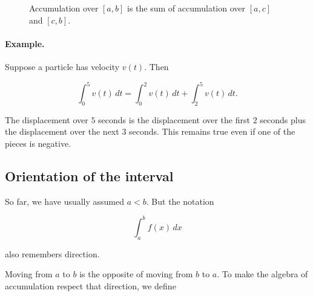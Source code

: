 \begin{figure}[h]
\centering
{}
\caption{Accumulation over \([a,b]\) is the sum of accumulation over \([a,c]\) and \([c,b]\).}
\label{fig:additivity-over-intervals}
\end{figure}

\paragraph{Example.}
Suppose a particle has velocity \(v(t)\).  Then

\[
\int_0^5 v(t)\,dt
=
\int_0^2 v(t)\,dt+\int_2^5 v(t)\,dt.
\]

The displacement over \(5\) seconds is the displacement over the first \(2\) seconds plus
the displacement over the next \(3\) seconds.  This remains true even if one of the pieces
is negative.

\subsection{Orientation of the interval}
\label{subsec:orientation-of-interval-integral}

So far, we have usually assumed \(a<b\).  But the notation

\[
\int_a^b f(x)\,dx
\]

also remembers direction.

Moving from \(a\) to \(b\) is the opposite of moving from \(b\) to \(a\).  To make the
algebra of accumulation respect that direction, we define

